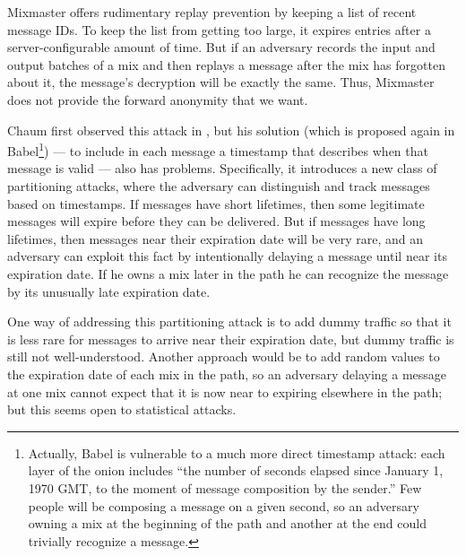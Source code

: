 \documentclass[11pt]{IEEEtran}
\begin{document}
Mixmaster offers rudimentary replay prevention by keeping a list of recent
message IDs. To keep the list from getting too large, it expires entries
after a server-configurable amount of time. But if an adversary records
the input and output batches of a mix and then replays a message after
the mix has forgotten about it, the message's decryption will be exactly
the same. Thus, Mixmaster does not provide the forward anonymity that we want.

Chaum first observed this attack in \cite{chaum-mix},
but his solution (which is proposed again in Babel\footnote{
  Actually, Babel is vulnerable to a much more direct timestamp attack:
  each layer of the onion includes ``the number of seconds
  elapsed since January 1, 1970 GMT, to the moment of message composition
  by the sender.'' Few people will be composing a message on a given
  second, so an adversary owning a mix at the beginning of the path and
  another at the end could trivially recognize a message.
}) --- to include in each message a timestamp that describes when that message
is valid --- also has problems. Specifically, it introduces a new class
of partitioning attacks, where the adversary can distinguish and
track messages based on timestamps.  If messages have short lifetimes,
then some legitimate messages will expire before they can be
delivered. But if messages have long lifetimes, then messages near
their expiration date will be very rare, and an adversary can exploit
this fact by intentionally delaying a message until near its expiration
date. If he owns a mix later in the path he can
recognize the message by its unusually late expiration date.


One way of addressing this partitioning attack is to add dummy traffic
so that it is less rare for messages to arrive near their expiration date,
but dummy traffic is still not well-understood. Another approach would
be to add random values to the expiration date of each mix in the path,
so an adversary delaying a message at one mix cannot expect that it
is now near to expiring elsewhere in the path; but this seems open to
statistical attacks.

\end{document}
